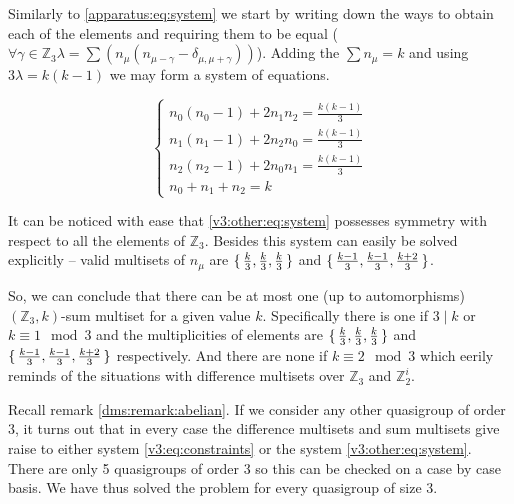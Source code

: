     Similarly to \eqref{apparatus:eq:system} we start by writing down the ways to obtain each of the elements and requiring them to be equal ($\forall \gamma \in \mathbb Z_3 \lambda = \sum (n_\mu (n_{\mu-\gamma}-\delta_{\mu,\mu+\gamma}))$). Adding the $\sum n_\mu = k$ and using $3\lambda = k(k-1)$ we may form a system of equations.
    
    \begin{equation}
        \label{v3:other:eq:system}
        \begin{cases}
            n_0 (n_0-1) + 2 n_1 n_2 = \frac{k(k-1)}{3} \\
            n_1 (n_1-1) + 2 n_2 n_0 = \frac{k(k-1)}{3} \\
            n_2 (n_2-1) + 2 n_0 n_1 = \frac{k(k-1)}{3} \\
            n_0 + n_1 + n_2 = k
        \end{cases}
    \end{equation}

    It can be noticed with ease that \eqref{v3:other:eq:system} possesses symmetry with respect to all the elements of $\mathbb Z_3$. Besides this system can easily be solved explicitly -- valid multisets of $n_\mu$ are $\set{\frac k 3, \frac k 3, \frac k 3}$ and $\set{\frac{k-1}{3}, \frac{k-1}{3}, \frac{k+2}{3}}$.
    
    So, we can conclude that there can be at most one (up to automorphisms) $(\mathbb Z_3, k)$-sum multiset for a given value $k$. Specifically there is one if $3 \mid k$ or $k \equiv 1 \mod 3$ and the multiplicities of elements are $\set{\frac k 3, \frac k 3, \frac k 3}$ and $\set{\frac{k-1}{3}, \frac{k-1}{3}, \frac{k+2}{3}}$ respectively. And there are none if $k \equiv 2 \mod 3$ which eerily reminds of the situations with difference multisets over $\mathbb Z_3$ and $\mathbb Z_2^i$.
    
    Recall remark \ref{dms:remark:abelian}. If we consider any other quasigroup of order 3, it turns out that in every case the difference multisets and sum multisets give raise to either system \eqref{v3:eq:constraints} or the system \eqref{v3:other:eq:system}. There are only 5 quasigroups of order 3 so this can be checked on a case by case basis. We have thus solved the problem for every quasigroup of size 3.
    
